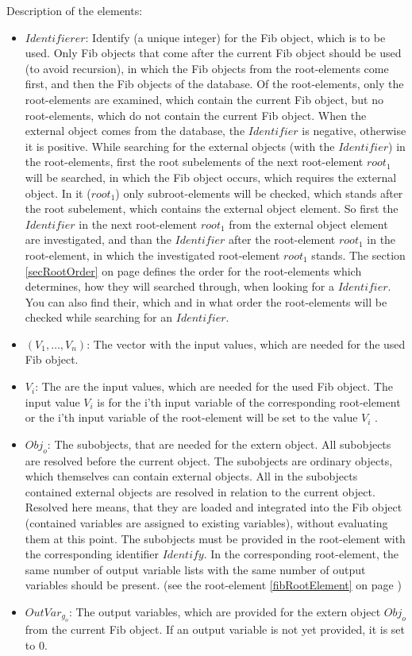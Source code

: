 \bigskip\noindent
Description of the elements:
\begin{itemize}
 \item $Identifierer$: Identify (a unique integer) for the Fib object, which is to be used. Only Fib objects that come after the current Fib object should be used (to avoid recursion), in which the Fib objects from the root-elements come first, and then the Fib objects of the database. Of the root-elements, only the root-elements are examined, which contain the current Fib object, but no root-elements, which do not contain the current Fib object. When the external object comes from the database, the $Identifier$ is negative, otherwise it is positive. While searching for the external objects (with the $Identifier$) in the root-elements, first the root subelements of the next root-element $root_1$ will be searched, in which the Fib object occurs, which requires the external object. In it ($root_1$) only subroot-elements will be checked, which stands after the root subelement, which contains the external object element. So first the $Identifier$ in the next root-element $root_1$ from the external object element are investigated, and than the $Identifier$ after the  root-element $root_1$ in the root-element, in which the investigated root-element $root_1$ stands. The section \ref{secRootOrder} on page \pageref{secRootOrder} defines the order for the root-elements which determines, how they will searched through, when looking for a $Identifier$. You can also find their, which and in what order the root-elements will be checked while searching for an $Identifier$.
 \item $( V_1 , \ldots , V_n )$: The vector with the input values, which are needed for the used Fib object. 
 \item $V_i$: The are the input values, which are needed for the used Fib object. The input value $V_i$ is for the i'th input variable of the corresponding root-element or the i'th input variable of the root-element will be set to the value $V_i$ .
 \item $Obj_o$: The subobjects, that are needed for the extern object. All subobjects are resolved before the current object. The subobjects are ordinary objects, which themselves can contain external objects. All in the subobjects contained external objects are resolved in relation to the current object. Resolved here means, that they are loaded and integrated into the Fib object (contained variables are assigned to existing variables), without evaluating them at this point. The subobjects must be provided in the root-element with the corresponding identifier $Identify$. In the corresponding root-element, the same number of output variable lists with the same number of output variables should be present. (see the root-element \ref{fibRootElement} on page \pageref{fibRootElement} )
 \item $OutVar_{g_o}$: The output variables, which are provided for the extern object $Obj_o$ from the current Fib object. If an output variable is not yet provided, it is set to $0$.
\end{itemize}


